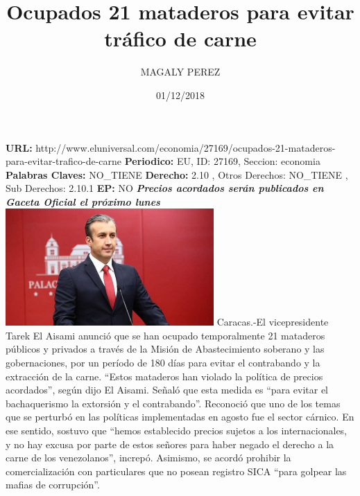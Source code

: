 \documentclass{article}%
\title{\textbf{Ocupados 21 mataderos para evitar tráfico de carne}}%
\author{MAGALY PEREZ}%
\date{01/12/2018}%
\begin{document}
%
\normalsize%
\maketitle%
\textbf{URL: }%
http://www.eluniversal.com/economia/27169/ocupados{-}21{-}mataderos{-}para{-}evitar{-}trafico{-}de{-}carne\newline%
%
\textbf{Periodico: }%
EU, %
ID: %
27169, %
Seccion: %
economia\newline%
%
\textbf{Palabras Claves: }%
NO\_TIENE\newline%
%
\textbf{Derecho: }%
2.10%
, Otros Derechos: %
NO\_TIENE%
, Sub Derechos: %
2.10.1%
\newline%
%
\textbf{EP: }%
NO\newline%
\newline%
%
\textbf{\textit{Precios acordados serán publicados en Gaceta Oficial el próximo lunes}}%
\newline%
\newline%
%
\includegraphics[width=300px]{42.jpg}%
\newline%
%
Caracas.{-}El vicepresidente Tarek El Aisami anunció que se han ocupado temporalmente 21 mataderos públicos y privados a través de la Misión de Abastecimiento soberano y las gobernaciones, por un período de 180 días  para evitar el contrabando y la extracción de la carne.%
\newline%
%
“Estos mataderos han violado la política de precios acordados”, según dijo El Aisami.%
\newline%
%
Señaló que esta medida es “para evitar el bachaquerismo la extorsión y el contrabando”.%
\newline%
%
Reconoció que uno de los temas que se perturbó en las políticas implementadas en agosto fue el sector cárnico.%
\newline%
%
En ese sentido, sostuvo que “hemos establecido precios sujetos a los internacionales, y no hay excusa por parte de estos señores para haber negado el derecho a la carne de los venezolanos”, increpó.%
\newline%
%
Asimismo, se acordó prohibir la comercialización con particulares que no posean registro SICA “para golpear las mafias de corrupción”.%
\end{document}
